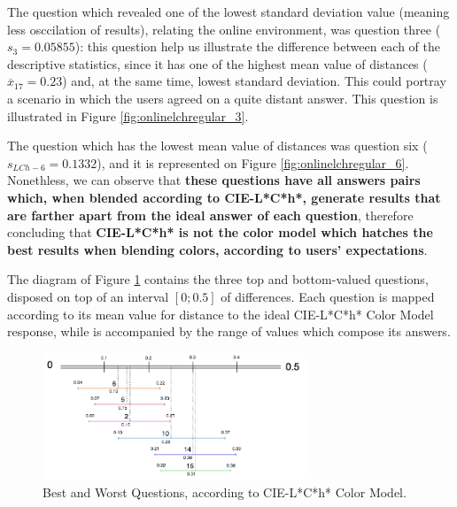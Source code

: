 %
The question which revealed one of the lowest standard deviation value (meaning less osccilation of results), relating the online environment, was question three ($s_{3} = 0.05855$): this question help us
illustrate the difference between each of the descriptive statistics, since it has one of the highest mean value of distances ($\overline{x}_{17} = 0.23$) and, at the same time, lowest standard deviation. This could
portray a scenario in which the users agreed on a quite distant answer. This question is illustrated in Figure \ref{fig:onlinelchregular_3}. \par
%
The question which has the lowest mean value of distances was question six ($s_{LCh-6} = 0.1332$), and it is represented on Figure \ref{fig:onlinelchregular_6}. Nonethless, we can observe that \textbf{these
questions have all answers pairs which, when blended according to CIE-L*C*h*, generate results that are farther apart from the ideal answer of each question}, therefore concluding that \textbf{CIE-L*C*h* is not
the color model which hatches the best results when blending colors, according to users' expectations}. \par
%
The diagram of Figure \ref{fig:lch_analysis} contains the three top and bottom-valued questions, disposed on top of an interval $[0 ; 0.5]$ of differences. Each question is mapped according to its mean value for
distance to the ideal CIE-L*C*h* Color Model response, while is accompanied by the range of values which compose its answers. \par
%
\begin{figure}[!htbp]
  \centering
  \includegraphics[width=0.7\textwidth]{images/results/lch_questions_analysis.png}
  \caption[Best and Worst Questions, according to CIE-L*C*h* Color Model.]{Best and Worst Questions, according to CIE-L*C*h* Color Model.}
  \label{fig:lch_analysis}
\end{figure}
%
%
